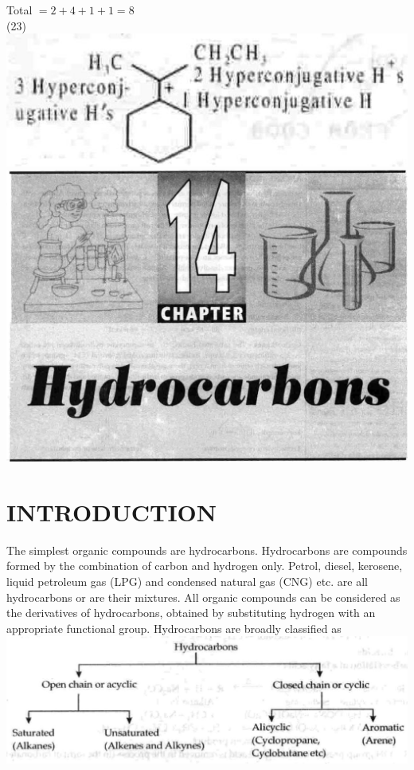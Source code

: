 \documentclass[10pt]{article}
\begin{document}
Total $=2+4+1+1=8$\\
(23)\\
\includegraphics[max width=\textwidth, center]{2025_01_28_8470952b98110cec3aabg-168}\\
\includegraphics[max width=\textwidth, center]{2025_01_28_8470952b98110cec3aabg-169(1)}

\section*{INTRODUCTION}
The simplest organic compounds are hydrocarbons. Hydrocarbons are compounds formed by the combination of carbon and hydrogen only. Petrol, diesel, kerosene, liquid petroleum gas (LPG) and condensed natural gas (CNG) etc. are all hydrocarbons or are their mixtures. All organic compounds can be considered as the derivatives of hydrocarbons, obtained by substituting hydrogen with an appropriate functional group. Hydrocarbons are broadly classified as\\
\includegraphics[max width=\textwidth, center]{2025_01_28_8470952b98110cec3aabg-169}
\end{document}
